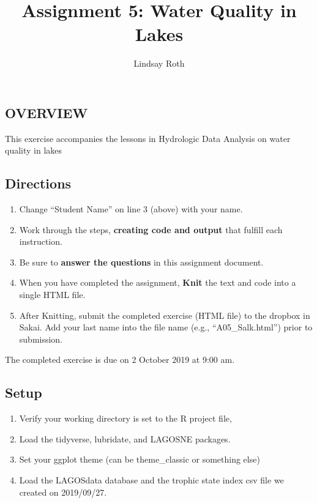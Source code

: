 \documentclass[]{article}
\title{Assignment 5: Water Quality in Lakes}
\author{Lindsay Roth}
\date{}
\providecommand{\tightlist}{%
  \setlength{\itemsep}{0pt}\setlength{\parskip}{0pt}}
\begin{document}
\maketitle

\hypertarget{overview}{%
\subsection{OVERVIEW}\label{overview}}

This exercise accompanies the lessons in Hydrologic Data Analysis on
water quality in lakes

\hypertarget{directions}{%
\subsection{Directions}\label{directions}}

\begin{enumerate}
\def\labelenumi{\arabic{enumi}.}
\tightlist
\item
  Change ``Student Name'' on line 3 (above) with your name.
\item
  Work through the steps, \textbf{creating code and output} that fulfill
  each instruction.
\item
  Be sure to \textbf{answer the questions} in this assignment document.
\item
  When you have completed the assignment, \textbf{Knit} the text and
  code into a single HTML file.
\item
  After Knitting, submit the completed exercise (HTML file) to the
  dropbox in Sakai. Add your last name into the file name (e.g.,
  ``A05\_Salk.html'') prior to submission.
\end{enumerate}

The completed exercise is due on 2 October 2019 at 9:00 am.

\hypertarget{setup}{%
\subsection{Setup}\label{setup}}

\begin{enumerate}
\def\labelenumi{\arabic{enumi}.}
\tightlist
\item
  Verify your working directory is set to the R project file,
\item
  Load the tidyverse, lubridate, and LAGOSNE packages.
\item
  Set your ggplot theme (can be theme\_classic or something else)
\item
  Load the LAGOSdata database and the trophic state index csv file we
  created on 2019/09/27.
\end{enumerate}
\end{document}
